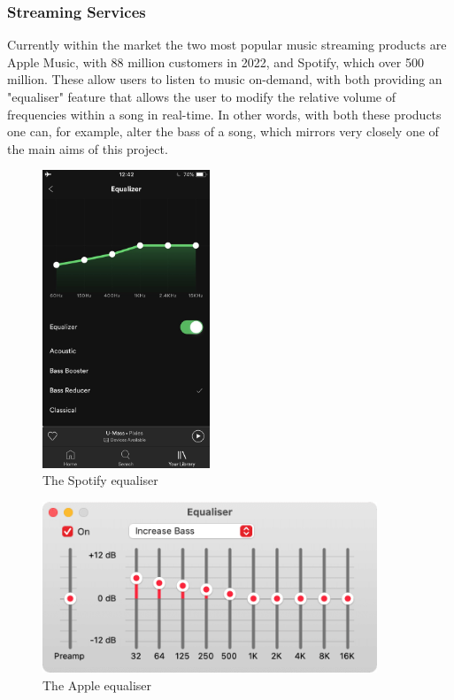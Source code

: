 \subsubsection{Streaming Services}
Currently within the market the two most popular music streaming products are Apple Music, with 88 million customers in 2022, and Spotify, which over 500 million. These allow users to listen to music on-demand, with both providing an "equaliser" feature that allows the user to modify the relative volume of frequencies within a song in real-time. In other words, with both these products one can, for example, alter the bass of a song, which mirrors very closely one of the main aims of this project.

\begin{figure}[H]
	\caption{The Spotify equaliser}
	\begin{center}
		\includegraphics[width=5cm]{./spotify equaliser.jpg}
	\end{center}
\end{figure}

\begin{figure}[H]
	\caption{The Apple equaliser}
	\begin{center}
		\includegraphics[width=10cm]{./apple equaliser.png}
	\end{center}
\end{figure}

